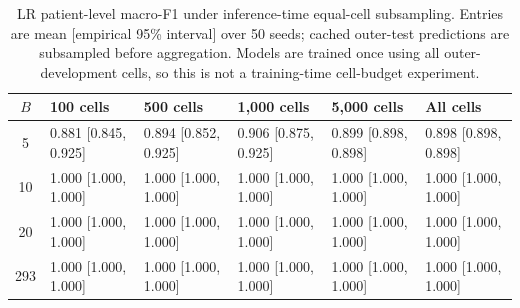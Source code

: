 \begin{table}[H]
\centering
\scriptsize
\setlength{\tabcolsep}{3pt}
\begin{tabular}{clllll}
\toprule
$B$ & 100 cells & 500 cells & 1,000 cells & 5,000 cells & All cells \\
\midrule
5 & 0.881 [0.845, 0.925] & 0.894 [0.852, 0.925] & 0.906 [0.875, 0.925] & 0.899 [0.898, 0.898] & 0.898 [0.898, 0.898] \\
10 & 1.000 [1.000, 1.000] & 1.000 [1.000, 1.000] & 1.000 [1.000, 1.000] & 1.000 [1.000, 1.000] & 1.000 [1.000, 1.000] \\
20 & 1.000 [1.000, 1.000] & 1.000 [1.000, 1.000] & 1.000 [1.000, 1.000] & 1.000 [1.000, 1.000] & 1.000 [1.000, 1.000] \\
293 & 1.000 [1.000, 1.000] & 1.000 [1.000, 1.000] & 1.000 [1.000, 1.000] & 1.000 [1.000, 1.000] & 1.000 [1.000, 1.000] \\
\bottomrule
\end{tabular}
\caption{LR patient-level macro-F1 under inference-time equal-cell subsampling. Entries are mean [empirical 95\% interval] over 50 seeds; cached outer-test predictions are subsampled before aggregation. Models are trained once using all outer-development cells, so this is not a training-time cell-budget experiment.}
\label{tab:psas_cellcount}
\end{table}
